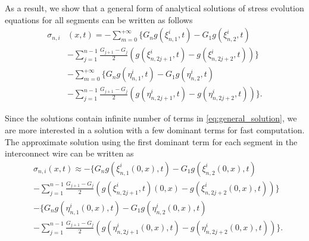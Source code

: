 As a result, we show that a general form of analytical solutions of stress evolution
equations for all segments can be written as follows
\begin{equation} \label{eq:general_solution}
\begin{split}
\sigma_{n,i}&(x,t)=-\sum\limits_{m=0}^{+\infty}\{G_ng(\xi_{n,1}^{i},t)-G_1g(\xi_{n,2}^{i},t)\\
&-\sum\limits_{j=1}^{n-1}\frac{G_{j+1}-G_j}{2}(g(\xi_{n,2j+1}^{i},t)-g(\xi_{n,2j+2}^{i},t))\}\\
&-\sum\limits_{m=0}^{+\infty}\{G_ng(\eta_{n,1}^{i},t)-G_1g(\eta_{n,2}^{i},t)\\
&-\sum\limits_{j=1}^{n-1}\frac{G_{j+1}-G_j}{2}(g(\eta_{n,2j+1}^{i},t)-g(\eta_{n,2j+2}^{i},t))\}.
 \end{split}
 \end{equation}

 Since the solutions contain infinite number of terms in
 \eqref{eq:general_solution}, we are more interested in a solution
 with a few dominant terms for fast computation. The approximate
 solution using the first dominant term for each segment in the
 interconnect wire can be written as 
\begin{equation} \label{eq:approximate_solution}
\begin{split}
&\sigma_{n,i}(x,t)\approx-\{G_ng(\xi_{n,1}^{i}(0,x),t)-G_1g(\xi_{n,2}^{i}(0,x),t)\\
&-\sum\limits_{j=1}^{n-1}\frac{G_{j+1}-G_j}{2}(g(\xi_{n,2j+1}^{i},t)(0,x)-g(\xi_{n,2j+2}^{i}(0,x),t))\}\\
&-\{G_ng(\eta_{n,1}^{i}(0,x),t)-G_1g(\eta_{n,2}^{i}(0,x),t)\\
&-\sum\limits_{j=1}^{n-1}\frac{G_{j+1}-G_j}{2}(g(\eta_{n,2j+1}^{i}(0,x),t)-g(\eta_{n,2j+2}^{i}(0,x),t))\}.
 \end{split}
 \end{equation}


